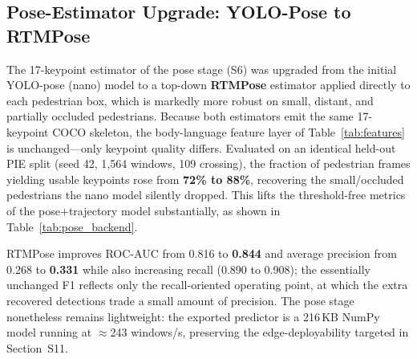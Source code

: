 \documentclass[conference]{IEEEtran}
\begin{document}
\subsection{Pose-Estimator Upgrade: YOLO-Pose to RTMPose}
\label{subsec:pose_backend}

The 17-keypoint estimator of the pose stage (S6) was upgraded from the initial
YOLO-pose (nano) model to a top-down \textbf{RTMPose} estimator applied directly
to each pedestrian box, which is markedly more robust on small, distant, and
partially occluded pedestrians. Because both estimators emit the same
17-keypoint COCO skeleton, the body-language feature layer of
Table~\ref{tab:features} is unchanged---only keypoint quality differs. Evaluated
on an identical held-out PIE split (seed 42, 1{,}564 windows, 109 crossing), the
fraction of pedestrian frames yielding usable keypoints rose from \textbf{72\% to
88\%}, recovering the small/occluded pedestrians the nano model silently dropped.
This lifts the threshold-free metrics of the pose$+$trajectory model
substantially, as shown in Table~\ref{tab:pose_backend}.

\begin{table}[h]
\centering
\small
\setlength{\tabcolsep}{4pt}
\renewcommand{\arraystretch}{1.15}
\caption{Effect of the pose-estimator upgrade on the pose$+$trajectory model
(PIE, held-out single split, seed 42, 1{,}564 windows). AUC and AP are
threshold-free; recall/F1 are at the recall-calibrated operating point.}
\label{tab:pose_backend}
\end{table}

RTMPose improves ROC-AUC from 0.816 to \textbf{0.844} and average precision from
0.268 to \textbf{0.331} while also increasing recall (0.890 to 0.908); the
essentially unchanged F1 reflects only the recall-oriented operating point, at
which the extra recovered detections trade a small amount of precision. The pose
stage nonetheless remains lightweight: the exported predictor is a 216\,KB NumPy
model running at $\approx$243 windows/s, preserving the edge-deployability
targeted in Section~S11.
\end{document}

